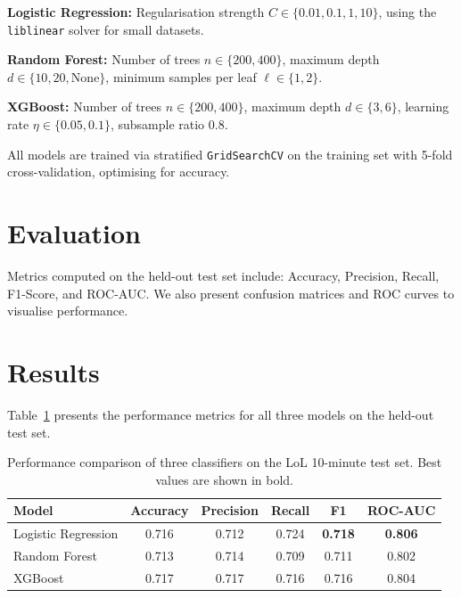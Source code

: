 \documentclass[runningheads]{llncs}
\begin{document}
\textbf{Logistic Regression:} Regularisation strength $C \in \{0.01, 0.1, 1, 10\}$, using the \texttt{liblinear} solver for small datasets.

\textbf{Random Forest:} Number of trees $n \in \{200, 400\}$, maximum depth $d \in \{10, 20, \text{None}\}$, minimum samples per leaf $\ell \in \{1, 2\}$.

\textbf{XGBoost:} Number of trees $n \in \{200, 400\}$, maximum depth $d \in \{3, 6\}$, learning rate $\eta \in \{0.05, 0.1\}$, subsample ratio 0.8.

All models are trained via stratified \texttt{GridSearchCV} on the training set with 5-fold cross-validation, optimising for accuracy.

\section{Evaluation}
Metrics computed on the held-out test set include: Accuracy, Precision, Recall, F1-Score, and ROC-AUC. We also present confusion matrices and ROC curves to visualise performance.

\section{Results}
Table~\ref{tab:results} presents the performance metrics for all three models on the held-out test set.

\begin{table}[t]
\caption{Performance comparison of three classifiers on the LoL 10-minute test set. Best values are shown in bold.}
\label{tab:results}
\centering
\begin{tabular}{@{}lccccc@{}}
\toprule
\textbf{Model} & \textbf{Accuracy} & \textbf{Precision} & \textbf{Recall} & \textbf{F1} & \textbf{ROC-AUC} \\
\midrule
Logistic Regression & 0.716 & 0.712 & 0.724 & \textbf{0.718} & \textbf{0.806} \\
Random Forest & 0.713 & 0.714 & 0.709 & 0.711 & 0.802 \\
XGBoost & 0.717 & 0.717 & 0.716 & 0.716 & 0.804 \\
\bottomrule
\end{tabular}
\end{table}
\end{document}
